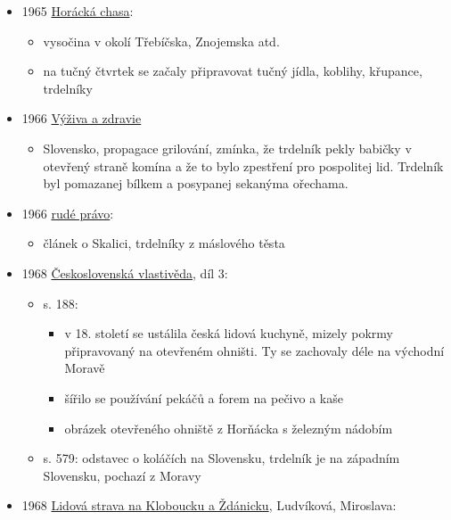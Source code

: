 \begin{itemize}
\tightlist
\item
  1965
  \href{https://ndk.cz/uuid/uuid:e1a51a10-09d1-11ea-a20e-005056827e51}{Horácká
  chasa}:

  \begin{itemize}
  \tightlist
  \item
    vysočina v okolí Třebíčska, Znojemska atd.
  \item
    na tučný čtvrtek se začaly připravovat tučný jídla, koblihy,
    křupance, trdelníky
  \end{itemize}
\item
  1966
  \href{https://dikda.snk.sk/uuid/uuid:656263cf-a9ec-466d-81b8-5a1ffef20756}{Výživa
  a zdravie}

  \begin{itemize}
  \tightlist
  \item
    Slovensko, propagace grilování, zmínka, že trdelník pekly babičky v
    otevřený straně komína a že to bylo zpestření pro pospolitej lid.
    Trdelník byl pomazanej bílkem a posypanej sekanýma ořechama.
  \end{itemize}
\item
  1966
  \href{https://ndk.cz/uuid/uuid:6fc6e800-b623-11dd-aa80-000d606f5dc6}{rudé
  právo}:

  \begin{itemize}
  \tightlist
  \item
    článek o Skalici, trdelníky z máslového těsta
  \end{itemize}
\item
  1968
  \href{https://ndk.cz/view/uuid:86449e60-654c-11e2-9d9f-005056827e52?page=uuid\%3A7c5078bd258a6084e96ff7134ee24101}{Československá
  vlastivěda}, díl 3:

  \begin{itemize}
  \tightlist
  \item
    s. 188:

    \begin{itemize}
    \tightlist
    \item
      v 18. století se ustálila česká lidová kuchyně, mizely pokrmy
      připravovaný na otevřeném ohništi. Ty se zachovaly déle na
      východní Moravě
    \item
      šířilo se používání pekáčů a forem na pečivo a kaše
    \item
      obrázek otevřeného ohniště z Horňácka s železným nádobím
    \end{itemize}
  \item
    s. 579: odstavec o koláčích na Slovensku, trdelník je na západním
    Slovensku, pochazí z Moravy
  \end{itemize}
\item
  1968
  \href{https://ceskadigitalniknihovna.cz/uuid/uuid:9e8373c6-0e68-11e4-a3ad-0050569d679d}{Lidová
  strava na Kloboucku a Ždánicku}, Ludvíková, Miroslava:


\end{itemize}
